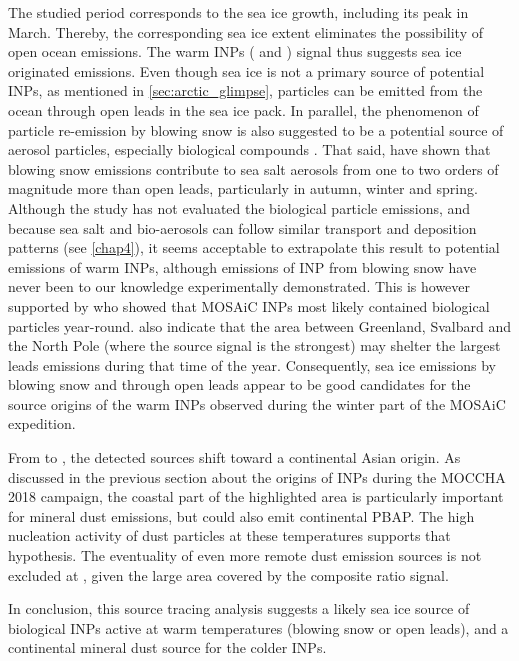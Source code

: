     The studied period corresponds to the sea ice growth, including its peak in March. Thereby, the corresponding sea ice extent eliminates the possibility of open ocean emissions. 
    The warm INPs ( and ) signal thus suggests sea ice originated emissions.
    Even though sea ice is not a primary source of potential INPs, as mentioned in \cref{sec:arctic_glimpse}, particles can be emitted from the ocean through open leads in the sea ice pack. 
    In parallel, the phenomenon of particle re-emission by blowing snow is also suggested to be a potential source of aerosol particles, especially biological compounds \citep{rangel-alvarado_snow-borne_2015, christner_ubiquity_2008}.
    That said, \citet{lapere_modeling_2024} have shown that blowing snow emissions contribute to sea salt aerosols from one to two orders of magnitude more than open leads, particularly in autumn, winter and spring. 
    Although the study has not evaluated the biological particle emissions, and because sea salt and bio-aerosols can follow similar transport and deposition patterns (see \cref{chap4}), it seems acceptable to extrapolate this result to potential emissions of warm INPs, although emissions of INP from blowing snow have never been to our knowledge experimentally demonstrated.
    This is however supported by \citet{barry_bioaerosols_2025} who showed that MOSAiC INPs most likely contained biological particles year-round.
    \citet{lapere_modeling_2024} also indicate that the area between Greenland, Svalbard and the North Pole (where the source signal is the strongest) may shelter the largest leads emissions during that time of the year.
    Consequently, sea ice emissions by blowing snow and through open leads appear to be good candidates for the source origins of the warm INPs observed during the winter part of the MOSAiC expedition.

    From  to , the detected sources shift toward a continental Asian origin. As discussed in the previous section about the origins of INPs during the MOCCHA 2018 campaign, the coastal part of the highlighted area is particularly important for mineral dust emissions, but could also emit continental PBAP.
    The high nucleation activity of dust particles at these temperatures supports that hypothesis.
    The eventuality of even more remote dust emission sources is not excluded at , given the large area covered by the composite ratio signal.

    In conclusion, this source tracing analysis suggests a likely sea ice source of biological INPs active at warm temperatures (blowing snow or open leads), and a continental mineral dust source for the colder INPs.

